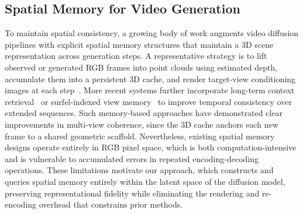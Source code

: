\subsection{Spatial Memory for Video Generation}
To maintain spatial consistency, a growing body of work augments video diffusion pipelines with explicit spatial memory structures that maintain a 3D scene representation across generation steps. A representative strategy is to lift observed or generated RGB frames into point clouds using estimated depth, accumulate them into a persistent 3D cache, and render target-view conditioning images at each step~\cite{yu2024wonderjourney,engstler2024invisible,yu2024wonderworld,huang2025voyager,zhao2026spatia,chen2025flexworld}. More recent systems further incorporate long-term context retrieval~\cite{yu2025context,xiao2025worldmem} or surfel-indexed view memory~\cite{li2025vmem} to improve temporal consistency over extended sequences. Such memory-based approaches have demonstrated clear improvements in multi-view coherence, since the 3D cache anchors each new frame to a shared geometric scaffold. Nevertheless, existing spatial memory designs operate entirely in RGB pixel space, which is both computation-intensive and is vulnerable to accumulated errors in repeated encoding-decoding operations. These limitations motivate our approach, which constructs and queries spatial memory entirely within the latent space of the diffusion model, preserving representational fidelity while eliminating the rendering and re-encoding overhead that constrains prior methods.
